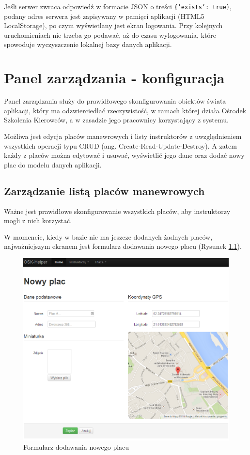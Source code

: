 \documentclass[twoside,a4paper,openright,12pt]{book}
\begin{document}
Jeśli serwer zwraca odpowiedź w formacie JSON o treści \texttt{\{'exists': true\}}, podany adres serwera jest zapisywany w pamięci aplikacji (HTML5 LocalStorage), po czym wyświetlany jest ekran logowania. Przy kolejnych uruchomieniach nie trzeba go podawać, aż do czasu wylogowania, które spowoduje wyczyszczenie lokalnej bazy danych aplikacji.


\chapter{Panel zarządzania - konfiguracja}

Panel zarządzania służy do prawidłowego skonfigurowania obiektów świata aplikacji, który ma odzwierciedlać rzeczywistość, w ramach której działa Ośrodek Szkolenia Kierowców, a w zasadzie jego pracownicy korzystający z systemu.

Możliwa jest edycja placów manewrowych i listy instruktorów z uwzględnieniem wszystkich operacji typu CRUD (ang. Create-Read-Update-Destroy). A zatem każdy z placów można edytować i usuwać, wyświetlić jego dane oraz dodać nowy plac do modelu danych aplikacji.


\newpage
\section{Zarządzanie listą placów manewrowych}

Ważne jest prawidłowe skonfigurowanie wszystkich placów, aby instruktorzy mogli z nich korzystać.

W momencie, kiedy w bazie nie ma jeszcze dodanych żadnych placów, najważniejszym ekranem jest formularz dodawania nowego placu (Rysunek \ref{fig:Nowy_plac}).

\begin{figure}[H]
\centering
\includegraphics[width=1\textwidth]{screenshots/panel/nowy_plac.png}
\caption{Formularz dodawania nowego placu}
\label{fig:Nowy_plac}
\end{figure}
\end{document}
